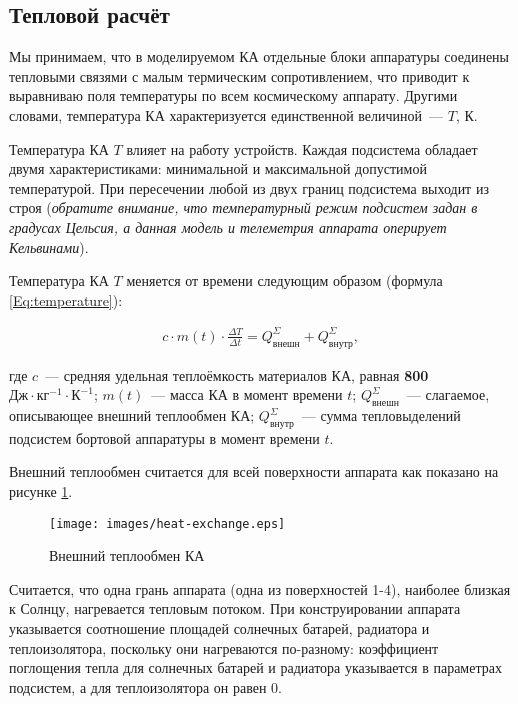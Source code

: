 \documentclass[12pt,a4paper]{article}
\begin{document}
\subsection{Тепловой расчёт}

Мы принимаем, что в моделируемом КА отдельные блоки аппаратуры соединены тепловыми связями
с малым термическим сопротивлением, что приводит к выравниваю поля температуры по всем
космическому аппарату. Другими словами, температура КА характеризуется единственной
величиной~--– $T$, К.

Температура КА $T$ влияет на работу устройств. Каждая подсистема обладает двумя
характеристиками: минимальной и максимальной допустимой температурой. При пересечении
любой из двух границ подсистема выходит из строя (\emph{обратите внимание, что температурный
режим подсистем задан в градусах Цельсия, а данная модель и телеметрия аппарата оперирует
Кельвинами}).

Температура КА $T$ меняется от времени следующим образом (формула \ref{Eq:temperature}):

\begin{eqnarray}
c \cdot m(t) \cdot \frac{\Delta T}{\Delta t} = Q^{\Sigma}_{\text{внешн}} + Q^{\Sigma}_{\text{внутр}}, \label{Eq:temperature}
\end{eqnarray}

где $c$~--- средняя удельная теплоёмкость материалов КА, равная \textbf{800 $\text{Дж}
  \cdot \text{кг}^{-1} \cdot \text{К}^{-1}$}; $m(t)$~--– масса КА в момент времени $t$;
$Q^{\Sigma}_{\text{внешн}}$~--- слагаемое, описывающее внешний теплообмен КА;
$Q^{\Sigma}_{\text{внутр}}$~--– сумма тепловыделений подсистем бортовой аппаратуры в
момент времени $t$.

Внешний теплообмен считается для всей поверхности аппарата как показано на рисунке \ref{Pic:heat-exchange}.

\begin{figure}[tbh]
  \begin{center}
    \texttt{[image: images/heat-exchange.eps]}
    \caption{Внешний теплообмен КА}
    \label{Pic:heat-exchange}
  \end{center}
\end{figure}

Считается, что одна грань аппарата (одна из поверхностей 1-4), наиболее близкая к Солнцу,
нагревается тепловым потоком. При конструировании аппарата указывается соотношение
площадей солнечных батарей, радиатора и теплоизолятора, поскольку они нагреваются
по-разному: коэффициент поглощения тепла для солнечных батарей и радиатора указывается в
параметрах подсистем, а для теплоизолятора он равен 0.
\end{document}
